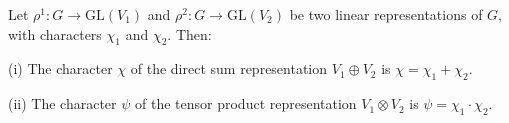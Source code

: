 Let $\rho^1: G \to \text{GL}(V_1)$ and $\rho^2: G \to \text{GL}(V_2)$ be two linear representations of $G$, with characters $\chi_1$ and $\chi_2$. Then:

(i) The character $\chi$ of the direct sum representation $V_1 \oplus V_2$ is $\chi = \chi_1 + \chi_2$.

(ii) The character $\psi$ of the tensor product representation $V_1 \otimes V_2$ is $\psi = \chi_1 \cdot \chi_2$.

